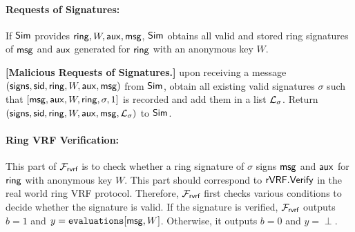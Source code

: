\paragraph{Requests of  Signatures:} If $ \mathsf{Sim} $ provides $ \mathsf{ring},W, \mathsf{aux}, \mathsf{msg}$, $ \mathsf{Sim} $  obtains all valid and stored ring signatures of $ \mathsf{msg} $ and $ \mathsf{aux} $ generated for $ \mathsf{ring} $ with an anonymous key $ W $.  

\begin{tcolorbox}[left=2pt,right=2pt]
	\textbf{[Malicious Requests of  Signatures.]} upon receiving a message $ (\mathsf{signs}, \textsf{sid}, \mathsf{ring}, W, \mathsf{aux},\mathsf{msg}) $ from $ \mathsf{Sim} $, obtain all existing valid signatures $ \sigma $ such that $ [\mathsf{msg}, \mathsf{aux},W,\mathsf{ring},\sigma, 1] $ is recorded and add them in a list $ {\mathcal{L}}_{\sigma} $. 	Return $ (\mathsf{signs}, \textsf{sid}, \mathsf{ring}, W,\mathsf{aux},\mathsf{msg}, {\mathcal{L}}_{\sigma})  $ to $ \mathsf{Sim} $.
\end{tcolorbox}


\paragraph{Ring VRF Verification:} This part of $ \mathcal{F}_{\textsf{rvrf}} $ is to check whether a ring signature of $ \sigma $ signs $ \mathsf{msg} $ and $ \mathsf{aux} $ for $ \mathsf{ring} $ with anonymous key $ W $. This part should correspond to $ {\mathsf{rVRF}}.{\mathsf{Verify}} $ in the real world ring VRF protocol. Therefore,
$ \mathcal{F}_{\textsf{rvrf}} $ first checks various conditions to decide whether the signature is valid. If the signature is verified, $ \mathcal{F}_{\textsf{rvrf}} $ outputs $ b = 1 $ and $ y = \texttt{evaluations}[\mathsf{msg}, W] $. Otherwise, it outputs $ b = 0 $ and $ y = \perp $. 


